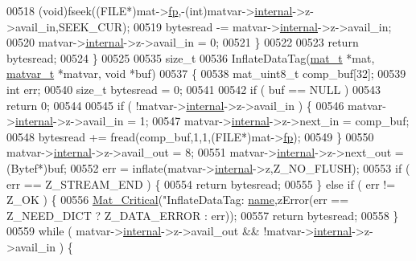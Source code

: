 \begin{DoxyCode}
{{{{{{{{{{{{{{{{00518         (void)fseek((FILE*)mat->\hyperlink{struct__mat__t_a85f562e407ca9ad4d2a6e14f839432b7}{fp},-(int)matvar->\hyperlink{group___m_a_t_a6e97e3ed9f40c49322c18561c2a94e92}{internal}->z->avail\_in,SEEK\_CUR);
00519         bytesread -= matvar->\hyperlink{group___m_a_t_a6e97e3ed9f40c49322c18561c2a94e92}{internal}->z->avail\_in;
00520         matvar->\hyperlink{group___m_a_t_a6e97e3ed9f40c49322c18561c2a94e92}{internal}->z->avail\_in = 0;
00521     \}
00522 
00523     \textcolor{keywordflow}{return} bytesread;
00524 \}
00525 
00535 \textcolor{keywordtype}{size\_t}
00536 InflateDataTag(\hyperlink{struct__mat__t}{mat\_t} *mat, \hyperlink{group___m_a_t_structmatvar__t}{matvar\_t} *matvar, \textcolor{keywordtype}{void} *buf)
00537 \{
00538     mat\_uint8\_t comp\_buf[32];
00539     \textcolor{keywordtype}{int}    err;
00540     \textcolor{keywordtype}{size\_t} bytesread = 0;
00541 
00542     \textcolor{keywordflow}{if} ( buf == NULL )
00543         \textcolor{keywordflow}{return} 0;
00544 
00545    \textcolor{keywordflow}{if} ( !matvar->\hyperlink{group___m_a_t_a6e97e3ed9f40c49322c18561c2a94e92}{internal}->z->avail\_in ) \{
00546         matvar->\hyperlink{group___m_a_t_a6e97e3ed9f40c49322c18561c2a94e92}{internal}->z->avail\_in = 1;
00547         matvar->\hyperlink{group___m_a_t_a6e97e3ed9f40c49322c18561c2a94e92}{internal}->z->next\_in = comp\_buf;
00548         bytesread += fread(comp\_buf,1,1,(FILE*)mat->\hyperlink{struct__mat__t_a85f562e407ca9ad4d2a6e14f839432b7}{fp});
00549     \}
00550     matvar->\hyperlink{group___m_a_t_a6e97e3ed9f40c49322c18561c2a94e92}{internal}->z->avail\_out = 8;
00551     matvar->\hyperlink{group___m_a_t_a6e97e3ed9f40c49322c18561c2a94e92}{internal}->z->next\_out = (Bytef*)buf;
00552     err = inflate(matvar->\hyperlink{group___m_a_t_a6e97e3ed9f40c49322c18561c2a94e92}{internal}->z,Z\_NO\_FLUSH);
00553     \textcolor{keywordflow}{if} ( err == Z\_STREAM\_END ) \{
00554         \textcolor{keywordflow}{return} bytesread;
00555     \} \textcolor{keywordflow}{else} \textcolor{keywordflow}{if} ( err != Z\_OK ) \{
00556         \hyperlink{group__mat__util_gaf51f2bfbb5580f575e4dd79757e2b80c}{Mat\_Critical}(\textcolor{stringliteral}{"InflateDataTag: %
      \hyperlink{group___m_a_t_a5d4b55b041e3b4fb50c04337f05ad909}{name},zError(err == Z\_NEED\_DICT ? Z\_DATA\_ERROR : err));
00557         \textcolor{keywordflow}{return} bytesread;
00558     \}
00559     \textcolor{keywordflow}{while} ( matvar->\hyperlink{group___m_a_t_a6e97e3ed9f40c49322c18561c2a94e92}{internal}->z->avail\_out && !matvar->\hyperlink{group___m_a_t_a6e97e3ed9f40c49322c18561c2a94e92}{internal}->z->avail\_in ) \{
}}}}}}}}}}}}}}}}}
\end{DoxyCode}
